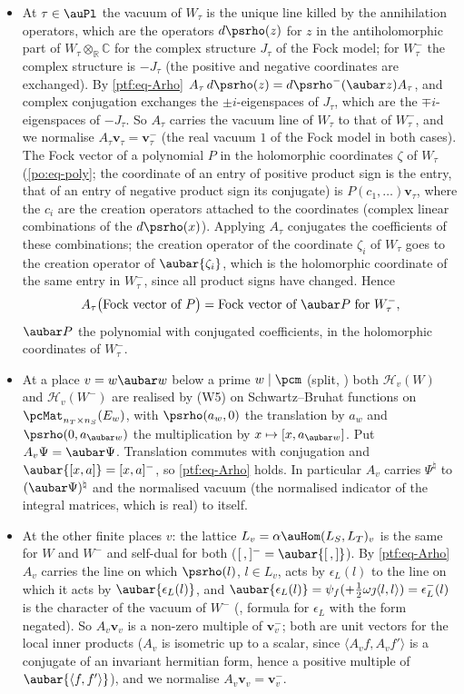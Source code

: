 \documentclass[10pt]{amsart}
\theoremstyle{definition}
\theoremstyle{remark}
\newcommand{\C}{\mathbb C}
\newcommand{\R}{\mathbb R}
\providecommand{\psHS}{\mathcal H}
\providecommand{\psvac}{\mathbf v}
\begin{document}
\begin{itemize}
\item[(A$_\infty$)] At $\tau\in\auPl$ the vacuum of $W_\tau$ is the unique line killed by the
annihilation operators, which are the operators $d\psrho(z)$ for $z$ in the antiholomorphic part of
$W_\tau\otimes_\R\C$ for the complex structure $J_\tau$ of the Fock model; for $W^-_\tau$ the complex
structure is $-J_\tau$ (the positive and negative coordinates are exchanged). By
\eqref{ptf:eq-Arho} $A_\tau\,d\psrho(z)=d\psrho^-(\aubar z)A_\tau$, and complex conjugation exchanges the
$\pm i$-eigenspaces of $J_\tau$, which are the $\mp i$-eigenspaces of $-J_\tau$. So $A_\tau$ carries the
vacuum line of $W_\tau$ to that of $W^-_\tau$, and we normalise $A_\tau\psvac_\tau=\psvac^-_\tau$ (the real
vacuum $1$ of the Fock model in both cases). The Fock vector of a polynomial $P$ in the holomorphic
coordinates $\zeta$ of $W_\tau$ (\eqref{po:eq-poly}; the coordinate of an entry of positive product sign is the
entry, that of an entry of negative product sign its conjugate) is $P(c_1,\dots)\psvac_\tau$, where the
$c_i$ are the creation operators attached to the coordinates (complex linear combinations of the
$d\psrho(x)$). Applying $A_\tau$ conjugates the coefficients of these combinations; the creation
operator of the coordinate $\zeta_i$ of $W_\tau$ goes to the creation operator of $\aubar{\zeta_i}$,
which is the holomorphic coordinate of the same entry in $W^-_\tau$, since all product signs have
changed. Hence
\[
A_\tau\bigl(\text{Fock vector of }P\bigr)=\text{Fock vector of }\aubar P\ \text{for }W^-_\tau,
\]
$\aubar P$ the polynomial with conjugated coefficients, in the holomorphic coordinates of $W^-_\tau$.
\item[(A$_\pcm$)] At a place $v=w\aubar w$ below a prime $w\mid\pcm$ (split, {\cite[\S2.3]{P53}}) both
$\psHS_v(W)$ and $\psHS_v(W^-)$ are realised by (W5) on Schwartz--Bruhat functions on
$\pcMat_{n_T\times n_S}(E_w)$, with $\psrho(a_w,0)$ the translation by $a_w$ and $\psrho(0,a_{\aubar w})$
the multiplication by $x\mapsto[x,a_{\aubar w}]$. Put $A_v\Psi=\aubar\Psi$. Translation commutes with
conjugation and $\aubar{[x,a]}=[x,a]^-$, so \eqref{ptf:eq-Arho} holds. In particular $A_v$ carries
$\Psi^\natural$ to $(\aubar\Psi)^\natural$ and the normalised vacuum (the normalised indicator of the
integral matrices, which is real) to itself.
\item[(A$_f$)] At the other finite places $v$: the lattice $L_v=\alpha\auHom(L_S,L_T)_v$ is the same
for $W$ and $W^-$ and self-dual for both ($[\,,]^-=\aubar{[\,,]}$). By \eqref{ptf:eq-Arho} $A_v$ carries
the line on which $\psrho(l)$, $l\in L_v$, acts by $\epsilon_L(l)$ to the line on which it acts by
$\aubar{\epsilon_L(l)}$, and $\aubar{\epsilon_L(l)}=\psi_f(+\frac12\omega\jmath\langle l,l\rangle)=\epsilon^-_L(l)$ is the
character of the vacuum of $W^-$ ({\cite[\S5.1.1]{P49}}, formula for $\epsilon_L$ with the form negated).
So $A_v\psvac_v$ is a non-zero multiple of $\psvac^-_v$; both are unit vectors for the local inner
products ($A_v$ is isometric up to a scalar, since $\langle A_vf,A_vf'\rangle$ is a conjugate of an
invariant hermitian form, hence a positive multiple of $\aubar{\langle f,f'\rangle}$), and we normalise
$A_v\psvac_v=\psvac^-_v$.
\end{itemize}
\end{document}

